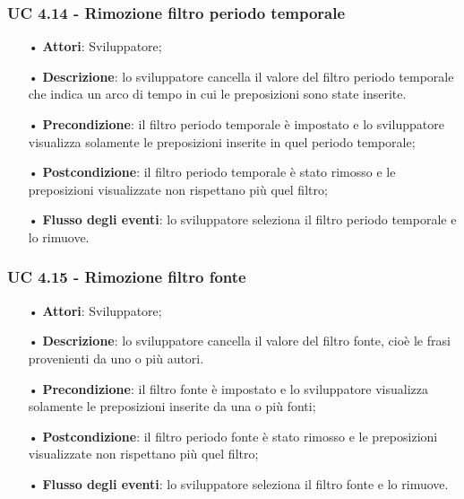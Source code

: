 \subsubsection{UC 4.14 - Rimozione filtro periodo temporale}
\begin{itemize}
	\item[•]\textbf{Attori}: Sviluppatore;
	\item[•]\textbf{Descrizione}: lo sviluppatore cancella il valore del filtro periodo temporale che indica un arco di tempo in cui le preposizioni sono state inserite.
	\item[•]\textbf{Precondizione}: il filtro periodo temporale è impostato e lo sviluppatore visualizza solamente le preposizioni inserite in quel periodo temporale;
	\item[•]\textbf{Postcondizione}: il filtro periodo temporale è stato rimosso e le preposizioni visualizzate non rispettano più quel filtro;
	\item[•]\textbf{Flusso degli eventi}: lo sviluppatore seleziona il filtro periodo temporale e lo rimuove.
\end{itemize}

\subsubsection{UC 4.15 - Rimozione filtro fonte}
\begin{itemize}
	\item[•]\textbf{Attori}: Sviluppatore;
	\item[•]\textbf{Descrizione}: lo sviluppatore cancella il valore del filtro fonte, cioè le frasi provenienti da uno o più autori.
	\item[•]\textbf{Precondizione}: il filtro fonte è impostato e lo sviluppatore visualizza solamente le preposizioni inserite da una o più fonti;
	\item[•]\textbf{Postcondizione}: il filtro periodo fonte è stato rimosso e le preposizioni visualizzate non rispettano più quel filtro;
	\item[•]\textbf{Flusso degli eventi}: lo sviluppatore seleziona il filtro fonte e lo rimuove.
\end{itemize}

